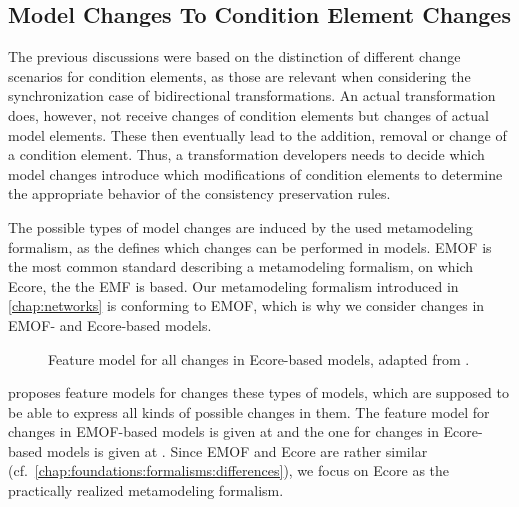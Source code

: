 

\subsection{Model Changes To Condition Element Changes}

The previous discussions were based on the distinction of different change scenarios for condition elements, as those are relevant when considering the synchronization case of bidirectional transformations.
An actual transformation does, however, not receive changes of condition elements but changes of actual model elements.
These then eventually lead to the addition, removal or change of a condition element.
Thus, a transformation developers needs to decide which model changes introduce which modifications of condition elements to determine the appropriate behavior of the consistency preservation rules.

The possible types of model changes are induced by the used metamodeling formalism, as the \metametamodel defines which changes can be performed in models.
\gls{EMOF} is the most common standard describing a metamodeling formalism, on which Ecore, the \metametamodel the \gls{EMF} is based.
Our metamodeling formalism introduced in \autoref{chap:networks} is conforming to \gls{EMOF}, which is why we consider changes in \gls{EMOF}- and Ecore-based models.


\begin{figure}
    \centering
    
    \caption{Feature model for all changes in Ecore-based models, adapted from \cite[Fig. 5.3]{kramer2017a}.}
    \label{fig:synchronization:change_feature_model}
\end{figure}

\textcite{kramer2017a} proposes feature models for changes these types of models, which are supposed to be able to express all kinds of possible changes in them.
The feature model for changes in \gls{EMOF}-based models is given at \cite[Fig. 5.2]{kramer2017a} and the one for changes in Ecore-based models is given at \cite[Fig. 5.3]{kramer2017a}.
Since \gls{EMOF} and Ecore are rather similar (cf.~\autoref{chap:foundations:formalisms:differences}), we focus on Ecore as the practically realized metamodeling formalism.

